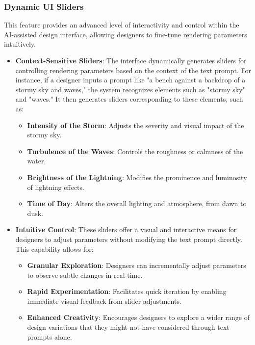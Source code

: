 \documentclass[12pt]{report}
\begin{document}
\subsubsection{Dynamic UI Sliders}

This feature provides an advanced level of interactivity and control within the AI-assisted design interface, allowing designers to fine-tune rendering parameters intuitively.

\begin{itemize}
    \item \textbf{Context-Sensitive Sliders}: The interface dynamically generates sliders for controlling rendering parameters based on the context of the text prompt. For instance, if a designer inputs a prompt like "a bench against a backdrop of a stormy sky and waves," the system recognizes elements such as "stormy sky" and "waves." It then generates sliders corresponding to these elements, such as:

    \begin{itemize}
        \item \textbf{Intensity of the Storm}: Adjusts the severity and visual impact of the stormy sky.
        \item \textbf{Turbulence of the Waves}: Controls the roughness or calmness of the water.
        \item \textbf{Brightness of the Lightning}: Modifies the prominence and luminosity of lightning effects.
        \item \textbf{Time of Day}: Alters the overall lighting and atmosphere, from dawn to dusk.
    \end{itemize}

    \item \textbf{Intuitive Control}: These sliders offer a visual and interactive means for designers to adjust parameters without modifying the text prompt directly. This capability allows for:

    \begin{itemize}
        \item \textbf{Granular Exploration}: Designers can incrementally adjust parameters to observe subtle changes in real-time.
        \item \textbf{Rapid Experimentation}: Facilitates quick iteration by enabling immediate visual feedback from slider adjustments.
        \item \textbf{Enhanced Creativity}: Encourages designers to explore a wider range of design variations that they might not have considered through text prompts alone.
    \end{itemize}


\end{itemize}
\end{document}
